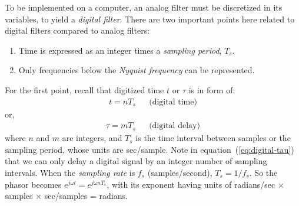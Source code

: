 To be implemented on a computer, an analog filter must be discretized
in its variables, to yield a \emph{digital filter}. There are two
important points here related to digital filters compared to analog
filters:

\begin{enumerate}
\item Time is expressed as an integer times a \emph{sampling period}, $T_s$.
\item Only frequencies below the \emph{Nyquist frequency} can be
represented.
\end{enumerate}

For the first point, recall that digitized time $t$ or $\tau$ is in form of:
\begin{align}
t=n T_s &&\text{(digital time)}
\end{align}
or, 
\begin{align}
\tau=m T_s &&\text{(digital delay)}\label{eq:digital-tau}
\end{align}
where $n$ and $m$ are integers, and $T_s$ is the time interval between
samples or the sampling period, whose units are sec/sample. Note in
equation~(\ref{eq:digital-tau}) that we can only delay a digital
signal by an integer number of sampling intervals. When the
\emph{sampling rate} is $f_s$ (samples/second), $T_s=1/f_s$. 
So the phasor becomes $e^{j\omega t} = e^{j\omega n T_s}$, with its
exponent having units of radians/sec $\times$ samples $\times$
sec/samples = radians.

